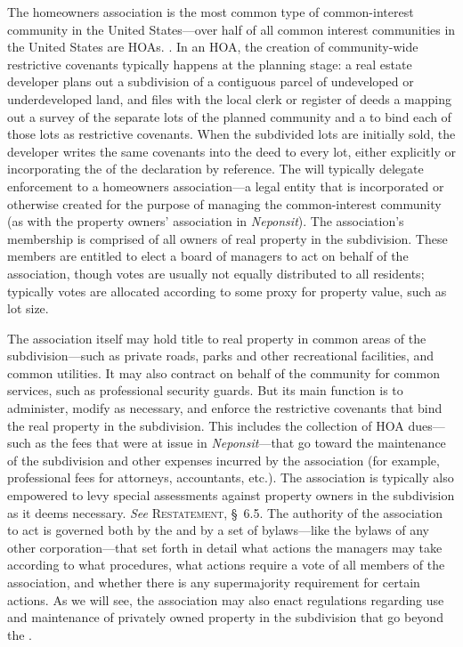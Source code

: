 

The homeowners association is the most common type of common-interest community
in the United States---over half of all common interest communities in the
United States are HOAs. .
In an HOA, the creation of community-wide
restrictive covenants typically happens at the planning stage: a real estate
developer plans out a subdivision of a contiguous parcel of undeveloped or
underdeveloped land, and files with the local clerk or register of deeds a
 mapping out a survey of the separate lots of the
planned community and a  to bind each of those lots as
restrictive
covenants. When the subdivided lots are initially sold, the developer writes the
same covenants into the deed to every lot, either explicitly or incorporating
the  of the declaration by reference. The  will
typically delegate enforcement to a homeowners association---a legal entity that
is incorporated or otherwise created for the purpose of managing the
common-interest community (as with the property owners' association in
\textit{Neponsit}). The association's membership is comprised of all owners of
real property in the subdivision. These members are entitled to elect a board of
managers to act on behalf of the association, though votes are usually not
equally distributed to all residents; typically votes are allocated according to
some proxy for property value, such as lot size.

The association itself may hold title to real property in common areas of the
subdivision---such as private roads, parks and other recreational facilities,
and common utilities. It may also contract on behalf of the community for common
services, such as professional security guards. But its main function is to
administer, modify as necessary, and enforce the restrictive covenants that bind
the real property in the subdivision. This includes the collection of HOA
dues---such as the fees that were at issue in \textit{Neponsit}---that go toward
the maintenance of the subdivision and other expenses incurred by the
association (for example, professional fees for attorneys, accountants, etc.).
The association is typically also empowered to levy special assessments against
property owners in the subdivision as it deems necessary. \textit{See}
\textsc{Restatement}, \S~6.5. The authority of the association to act is
governed both by the  and by a set of bylaws---like the bylaws of
any other corporation---that set forth in detail what actions the managers may
take according to what procedures, what actions require a vote of all members of
the association, and whether there is any supermajority requirement for certain
actions. As we will see, the association may also enact regulations regarding
use and maintenance of privately owned property in the subdivision that go
beyond the .

